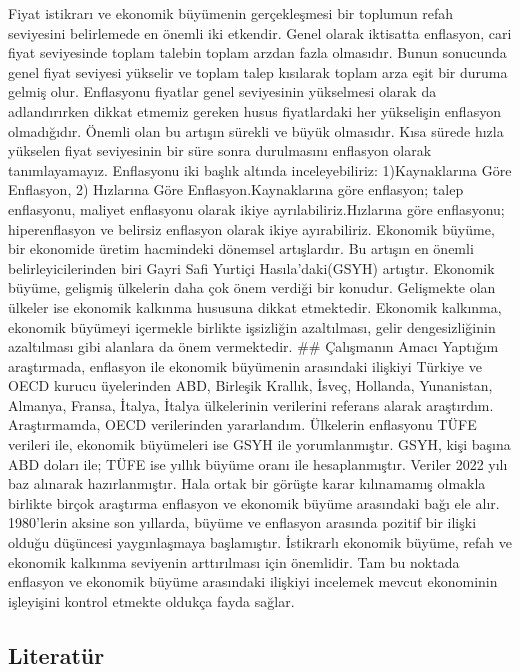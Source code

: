 \documentclass[
  12pt,
]{article}
\begin{document}
Fiyat istikrarı ve ekonomik büyümenin gerçekleşmesi bir toplumun refah seviyesini belirlemede en önemli iki etkendir. Genel olarak iktisatta enflasyon, cari fiyat seviyesinde toplam talebin toplam arzdan fazla olmasıdır. Bunun sonucunda genel fiyat seviyesi yükselir ve toplam talep kısılarak toplam arza eşit bir duruma gelmiş olur. Enflasyonu fiyatlar genel seviyesinin yükselmesi olarak da adlandırırken dikkat etmemiz gereken husus fiyatlardaki her yükselişin enflasyon olmadığıdır. Önemli olan bu artışın sürekli ve büyük olmasıdır. Kısa sürede hızla yükselen fiyat seviyesinin bir süre sonra durulmasını enflasyon olarak tanımlayamayız.
Enflasyonu iki başlık altında inceleyebiliriz: 1)Kaynaklarına Göre Enflasyon, 2) Hızlarına Göre Enflasyon.Kaynaklarına göre enflasyon; talep enflasyonu, maliyet enflasyonu olarak ikiye ayrılabiliriz.Hızlarına göre enflasyonu; hiperenflasyon ve belirsiz enflasyon olarak ikiye ayırabiliriz.
Ekonomik büyüme, bir ekonomide üretim hacmindeki dönemsel artışlardır. Bu artışın en önemli belirleyicilerinden biri Gayri Safi Yurtiçi Hasıla'daki(GSYH) artıştır. Ekonomik büyüme, gelişmiş ülkelerin daha çok önem verdiği bir konudur. Gelişmekte olan ülkeler ise ekonomik kalkınma hususuna dikkat etmektedir. Ekonomik kalkınma, ekonomik büyümeyi içermekle birlikte işsizliğin azaltılması, gelir dengesizliğinin azaltılması gibi alanlara da önem vermektedir.
\#\# Çalışmanın Amacı
Yaptığım araştırmada, enflasyon ile ekonomik büyümenin arasındaki ilişkiyi Türkiye ve OECD kurucu üyelerinden ABD, Birleşik Krallık, İsveç, Hollanda, Yunanistan, Almanya, Fransa, İtalya, İtalya ülkelerinin verilerini referans alarak araştırdım. Araştırmamda, OECD verilerinden yararlandım. Ülkelerin enflasyonu TÜFE verileri ile, ekonomik büyümeleri ise GSYH ile yorumlanmıştır. GSYH, kişi başına ABD doları ile; TÜFE ise yıllık büyüme oranı ile hesaplanmıştır. Veriler 2022 yılı baz alınarak hazırlanmıştır.
Hala ortak bir görüşte karar kılınamamış olmakla birlikte birçok araştırma enflasyon ve ekonomik büyüme arasındaki bağı ele alır. 1980'lerin aksine son yıllarda, büyüme ve enflasyon arasında pozitif bir ilişki olduğu düşüncesi yaygınlaşmaya başlamıştır. İstikrarlı ekonomik büyüme, refah ve ekonomik kalkınma seviyenin arttırılması için önemlidir. Tam bu noktada enflasyon ve ekonomik büyüme arasındaki ilişkiyi incelemek mevcut ekonominin işleyişini kontrol etmekte oldukça fayda sağlar.

\hypertarget{literatuxfcr}{%
\subsection{Literatür}\label{literatuxfcr}}
\end{document}

